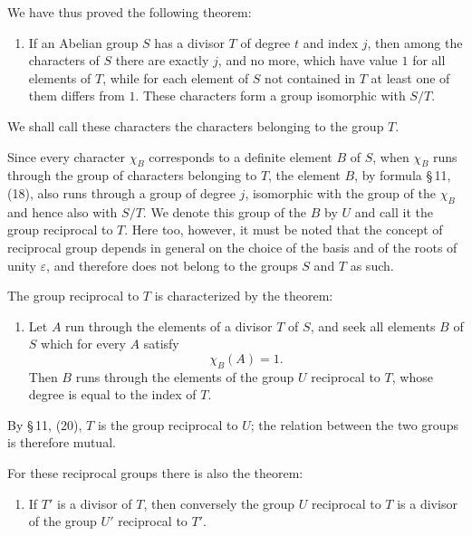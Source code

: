 \documentclass[11pt]{article}
\begin{document}
We have thus proved the following theorem:

\begin{enumerate}[label=\arabic*.,start=7]
\item If an Abelian group $S$ has a divisor $T$ of degree $t$ and index $j$, then among the characters of $S$ there are exactly $j$, and no more, which have value $1$ for all elements of $T$, while for each element of $S$ not contained in $T$ at least one of them differs from $1$. These characters form a group isomorphic with $S/T$.
\end{enumerate}

We shall call these characters the characters belonging to the group $T$.

Since every character $\chi_B$ corresponds to a definite element $B$ of $S$, when $\chi_B$ runs through the group of characters belonging to $T$, the element $B$, by formula \S\,11, (18), also runs through a group of degree $j$, isomorphic with the group of the $\chi_B$ and hence also with $S/T$. We denote this group of the $B$ by $U$ and call it the group reciprocal to $T$. Here too, however, it must be noted that the concept of reciprocal group depends in general on the choice of the basis and of the roots of unity $\varepsilon$, and therefore does not belong to the groups $S$ and $T$ as such.

The group reciprocal to $T$ is characterized by the theorem:

\begin{enumerate}[resume,label=\arabic*.]
\item Let $A$ run through the elements of a divisor $T$ of $S$, and seek all elements $B$ of $S$ which for every $A$ satisfy
\begin{equation}
\chi_B(A)=1.
\tag{7}
\end{equation}
Then $B$ runs through the elements of the group $U$ reciprocal to $T$, whose degree is equal to the index of $T$.
\end{enumerate}

By \S\,11, (20), $T$ is the group reciprocal to $U$; the relation between the two groups is therefore mutual.

For these reciprocal groups there is also the theorem:

\begin{enumerate}[resume,label=\arabic*.]
\item If $T'$ is a divisor of $T$, then conversely the group $U$ reciprocal to $T$ is a divisor of the group $U'$ reciprocal to $T'$.
\end{enumerate}
\end{document}

